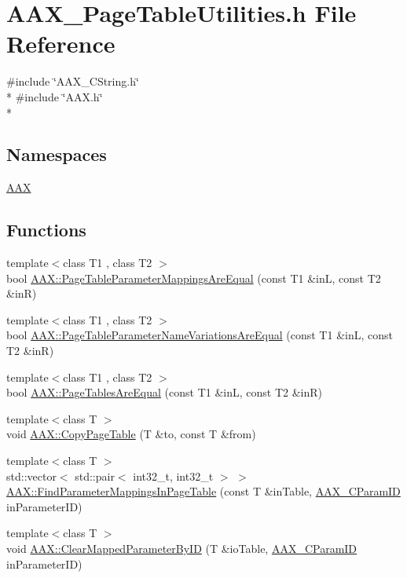 \hypertarget{a00274}{}\section{A\+A\+X\+\_\+\+Page\+Table\+Utilities.\+h File Reference}
\label{a00274}
{\ttfamily \#include \char`\"{}A\+A\+X\+\_\+\+C\+String.\+h\char`\"{}}\\*
{\ttfamily \#include \char`\"{}A\+A\+X.\+h\char`\"{}}\\*
\subsection*{Namespaces}
\begin{DoxyCompactItemize}
\item 
 \hyperlink{a00288}{A\+A\+X}
\end{DoxyCompactItemize}
\subsection*{Functions}
\begin{DoxyCompactItemize}
\item 
{\footnotesize template$<$class T1 , class T2 $>$ }\\bool \hyperlink{a00288_a6615318d686a57585ba69565f8e6a99b}{A\+A\+X\+::\+Page\+Table\+Parameter\+Mappings\+Are\+Equal} (const T1 \&in\+L, const T2 \&in\+R)
\item 
{\footnotesize template$<$class T1 , class T2 $>$ }\\bool \hyperlink{a00288_a2e75756c486e5db4ffa91579bb486a6a}{A\+A\+X\+::\+Page\+Table\+Parameter\+Name\+Variations\+Are\+Equal} (const T1 \&in\+L, const T2 \&in\+R)
\item 
{\footnotesize template$<$class T1 , class T2 $>$ }\\bool \hyperlink{a00288_a315085bafc0ddf4e7043a69d070da2fb}{A\+A\+X\+::\+Page\+Tables\+Are\+Equal} (const T1 \&in\+L, const T2 \&in\+R)
\item 
{\footnotesize template$<$class T $>$ }\\void \hyperlink{a00288_a99fe28eb20cfcef49e99710060c5ebe0}{A\+A\+X\+::\+Copy\+Page\+Table} (T \&to, const T \&from)
\item 
{\footnotesize template$<$class T $>$ }\\std\+::vector$<$ std\+::pair$<$ int32\+\_\+t, int32\+\_\+t $>$ $>$ \hyperlink{a00288_ac87bacdbc6323ab3f099c16ed8b508be}{A\+A\+X\+::\+Find\+Parameter\+Mappings\+In\+Page\+Table} (const T \&in\+Table, \hyperlink{a00149_a1440c756fe5cb158b78193b2fc1780d1}{A\+A\+X\+\_\+\+C\+Param\+I\+D} in\+Parameter\+I\+D)
\item 
{\footnotesize template$<$class T $>$ }\\void \hyperlink{a00288_ae583643c21c696c4d094a500b4e6d77e}{A\+A\+X\+::\+Clear\+Mapped\+Parameter\+By\+I\+D} (T \&io\+Table, \hyperlink{a00149_a1440c756fe5cb158b78193b2fc1780d1}{A\+A\+X\+\_\+\+C\+Param\+I\+D} in\+Parameter\+I\+D)
\end{DoxyCompactItemize}
